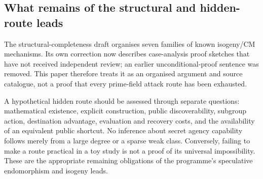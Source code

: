 \subsection{What remains of the structural and hidden-route leads}

The structural-completeness draft organises seven families of known
isogeny/CM mechanisms. Its own correction now describes case-analysis
proof sketches that have not received independent review; an earlier
unconditional-proof sentence was removed. This paper therefore treats
it as an organised argument and source catalogue, not a proof that every
prime-field attack route has been exhausted.

A hypothetical hidden route should be assessed through separate
questions: mathematical existence, explicit construction, public
discoverability, subgroup action, destination advantage, evaluation and
recovery costs, and the availability of an equivalent public shortcut.
No inference about secret agency capability follows merely from a
large degree or a sparse weak class. Conversely, failing to make a
route practical in a toy study is not a proof of its universal
impossibility. These are the appropriate remaining obligations of the
programme's speculative endomorphism and isogeny leads.
